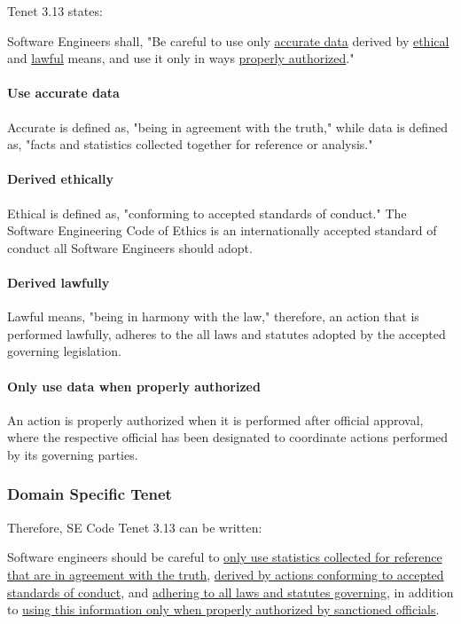 \documentclass[12pt]{article}
\begin{document}
\begin{multicols}{2}
Tenet 3.13  states:
\begin{framed}
Software Engineers shall, "Be careful to use only \ul{accurate data} derived by \ul{ethical} and \ul{lawful} means, and use it only in ways \ul{properly authorized}."\cite{softwareEngineeringCodeOfEthics}
\end{framed}

\paragraph{Use accurate data}
Accurate is defined as, "being in agreement with the truth," while data is defined as, "facts and statistics collected together for reference or analysis."\cite{accurateDefinition}\cite{dataDefinition}

\paragraph{Derived ethically}
Ethical is defined as, "conforming to accepted standards of conduct."\cite{ethicalDefinition} The Software Engineering Code of Ethics is an internationally accepted standard of conduct all Software Engineers should adopt.

\paragraph{Derived lawfully}
Lawful means, "being in harmony with the law," therefore, an action that is performed lawfully, adheres to the all laws and statutes adopted by the accepted governing legislation.\cite{lawfulDefinition}

\paragraph{Only use data when properly authorized}
An action is properly authorized when it is performed after official approval, where the respective official has been designated to coordinate actions performed by its governing parties.

\subsubsection{Domain Specific Tenet}

Therefore, SE Code Tenet 3.13 can be written:
\begin{framed}
Software engineers should be careful to \ul{only use statistics collected for reference that are in agreement with the truth}, \ul{derived by actions conforming to accepted standards of conduct}, and \ul{adhering to all laws and statutes governing}, in addition to \ul{using this information only when properly authorized by sanctioned officials}.
\end{framed}


\end{multicols}
\end{document}
